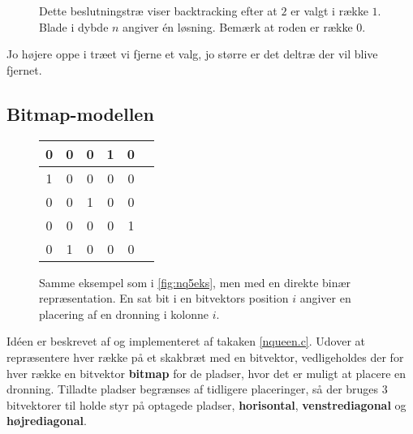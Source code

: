 \documentclass[pdf,draft,a4paper,11pt]{article}
\begin{document}
\begin{figure}[!h]
\begin{center}
	

\caption{
Dette beslutningstræ viser backtracking efter at $2$ er valgt i række $1$. Blade i dybde $n$ angiver én løsning. Bemærk at roden er række 0.}
\label{fig:tree}
\end{center}
\end{figure}

Jo højere oppe i træet vi fjerne et valg, jo større er det deltræ der vil blive fjernet.

\subsection{Bitmap-modellen}\label{bitmapmodellen}

\begin{figure}
\begin{center}
\begin{tabular}{|c|c|c|c|c|c}
\hline	0 & 0 & 0 & 1 & 0 \\
\hline	1 & 0 & 0 & 0 & 0 \\
\hline	0 & 0 & 1 & 0 & 0 \\
\hline	0 & 0 & 0 & 0 & 1 \\
\hline	0 & 1 & 0 & 0 & 0 \\
\hline
\end{tabular}
\end{center}
\caption{Samme eksempel som i \ref{fig:nq5eks}, men med en direkte binær repræsentation. En sat bit i en bitvektors position $i$ angiver en placering af en dronning i kolonne $i$.}
\label{fig:nq5eksbitmap}
\end{figure}

Idéen er beskrevet af \cite{Zongyan02} og implementeret af takaken \ref{nqueen.c}. Udover at repræsentere hver række på et skakbræt med en bitvektor, vedligeholdes der for hver række  en bitvektor \textbf{bitmap} for de pladser, hvor det er muligt at placere en dronning.  Tilladte pladser begrænses af tidligere placeringer, så der bruges 3 bitvektorer til holde styr på optagede pladser, \textbf{horisontal}, \textbf{venstrediagonal}  og \textbf{højrediagonal}.
\end{document}
